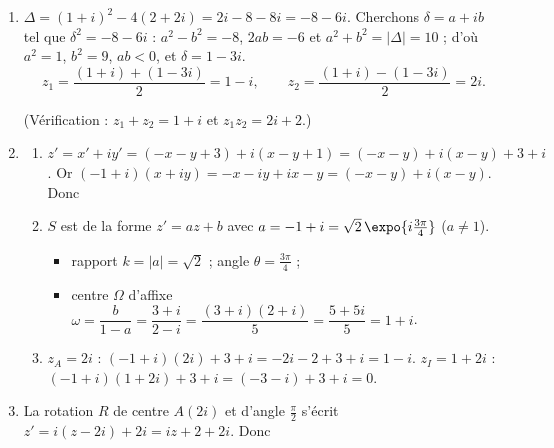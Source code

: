 \begin{enumerate}
   \item {}
      $\Delta = (1+i)^2 - 4(2 + 2i) = 2i - 8 - 8i = -8 - 6i$.
      Cherchons $\delta = a + ib$ tel que $\delta^2 = -8 - 6i$ : $a^2 - b^2 = -8$, $2ab = -6$ et
      $a^2 + b^2 = |\Delta| = 10$ ; d'o\`u $a^2 = 1$, $b^2 = 9$, $ab < 0$, et $\delta = 1 - 3i$.
      \[
         z_1 = \frac{(1+i) + (1 - 3i)}{2} = 1 - i, \qquad z_2 = \frac{(1+i) - (1-3i)}{2} = 2i.
      \]
      \par\noindent{}
      (V\'erification : $z_1 + z_2 = 1 + i$ et $z_1 z_2 = 2i + 2$.)
   \item
      \begin{enumerate}
         \item {}
            $z' = x' + iy' = (-x - y + 3) + i(x - y + 1) = (-x - y) + i(x - y) + 3 + i$.
            Or $(-1+i)(x + iy) = -x - iy + ix - y = (-x - y) + i(x - y)$. Donc
            \par\noindent{}
         \item {}
            $S$ est de la forme $z' = az + b$ avec $a = -1 + i = \sqrt{2}\,\expo{i\frac{3\pi}{4}}$ ($a \neq 1$).
            \begin{itemize}
               \item rapport $k = |a| = \sqrt{2}$ ; angle $\theta = \frac{3\pi}{4}$ ;
               \item centre $\Omega$ d'affixe $\omega = \dfrac{b}{1 - a} = \dfrac{3 + i}{2 - i} = \dfrac{(3+i)(2+i)}{5} = \dfrac{5 + 5i}{5} = 1 + i$.
            \end{itemize}
            \par\noindent{}
         \item {}
            $z_A = 2i$ : $(-1+i)(2i) + 3 + i = -2i - 2 + 3 + i = 1 - i$.
            $z_I = 1 + 2i$ : $(-1+i)(1+2i) + 3 + i = (-3 - i) + 3 + i = 0$.
            \par\noindent{}
      \end{enumerate}
   \item {}
      La rotation $R$ de centre $A(2i)$ et d'angle $\frac{\pi}{2}$ s'\'ecrit $z' = i(z - 2i) + 2i = iz + 2 + 2i$. Donc

\end{enumerate}
